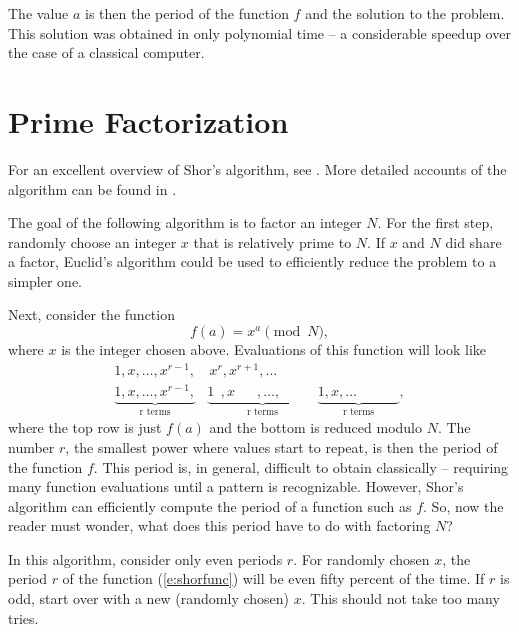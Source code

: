 The value $a$ is then the period of the function $f$ and the
solution to the problem.  This solution was obtained in only polynomial 
time -- a considerable speedup over the case of a classical computer.



\section{Prime Factorization}


For an excellent overview of Shor's algorithm,
see \cite{Braunstein:96}.  More detailed accounts
of the algorithm can be found in \cite{Shor:94,Shor:00}.

The goal of the following algorithm is to factor an integer $N$.
For the first step, randomly choose an integer $x$ that
is relatively prime to $N$.  If $x$ and $N$ did share a 
factor, Euclid's algorithm could be used to efficiently 
reduce the problem to a simpler one.

Next, consider the function
\begin{equation}
f(a) = x^a\pmod{N},
\label{e:shorfunc}
\end{equation}
where $x$ is the integer chosen above.
Evaluations of this function will look like
\begin{equation}
\begin{split}
1,x,\ldots,x^{r-1},             &\,x^r,x^{r+1},\ldots\\
\underbrace{1,x,\ldots,x^{r-1},}_{\text{r terms}}
&\underbrace{1^{\phantom{x}},x^{\phantom{r-1}},\ldots,\phantom{x^{r-1},}}_{\text{r terms}}
\underbrace{ 1,x,\ldots\phantom{,x^{r-1},}}_{\text{r terms}},
\end{split}
\end{equation}
where the top row is just $f(a)$ and the bottom is reduced modulo $N$.
The number $r$, the smallest power where values start to 
repeat, is then the period of the function $f$.
This period is, in general, difficult to obtain classically -- 
requiring many function evaluations until a pattern
is recognizable.  However, Shor's algorithm can efficiently compute the
period of a function such as $f$.  
So, now the reader must wonder, what does this period have to do with 
factoring $N$?

In this algorithm, consider only even periods $r$.
For randomly chosen $x$, the period $r$ of the function (\ref{e:shorfunc})
will be even fifty percent of the time.  If $r$ is odd, start over with
a new (randomly chosen) $x$.  This should not take too many 
tries\cite{Shor:94,Ekert/Jozsa:96}.

